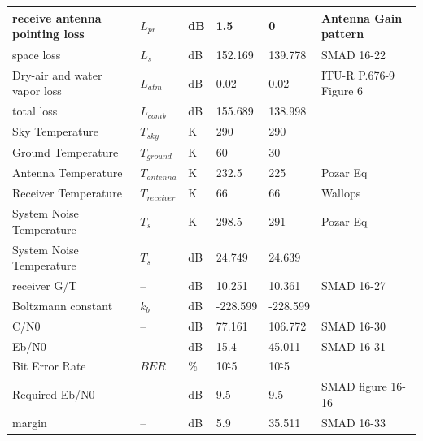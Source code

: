 \documentclass[12pt]{article}
\begin{document}
\begin{center}
\begin{longtable}{| p{3.9cm} | p{1.6cm} | p{1.4cm} | p{1.4cm} | p{1.4cm} | p{5cm} |}
    receive antenna pointing loss & $L_{pr}$ & dB    & 1.5   & 0     & Antenna Gain pattern \\\hline
    space loss & $L_s$  & dB    & 152.169 & 139.778 & SMAD 16-22 \\\hline
    Dry-air and water vapor loss & $L_{atm}$ & dB    & 0.02  & 0.02  & ITU-R P.676-9 Figure 6 \\\hline
    total loss & $L_{comb}$ & dB    & 155.689 & 138.998 &  \\\hline
    Sky Temperature & $T_{sky}$ & K     & 290   & 290   &  \\\hline
    Ground Temperature & $T_{ground}$ & K     & 60    & 30    &  \\\hline
    Antenna Temperature & $T_{antenna}$ & K     & 232.5 & 225   & Pozar Eq \\\hline
    Receiver Temperature & $T_{receiver}$ & K     & 66    & 66    & Wallops \\\hline
    System Noise Temperature & $T_s$  & K     & 298.5 & 291   & Pozar Eq \\\hline
    System Noise Temperature & $T_s$  & dB    & 24.749 & 24.639 &  \\\hline
    receiver G/T & --    & dB    & 10.251 & 10.361 & SMAD 16-27 \\\hline
    Boltzmann constant & $k_b$  & dB    & -228.599 & -228.599 &  \\\hline
    C/N0  & --    & dB    & 77.161 & 106.772 & SMAD 16-30 \\\hline
    Eb/N0 & --    & dB    & 15.4  & 45.011 & SMAD 16-31 \\\hline
    Bit Error Rate & $BER$   & \%    & 10\^-5 & 10\^-5 &  \\\hline
    Required Eb/N0 & --    & dB    & 9.5   & 9.5   & SMAD figure 16-16 \\\hline
    margin & --    & dB    & 5.9   & 35.511 & SMAD 16-33 \\
\hline
\end{longtable}
\end{center}

\noindent
\newline
\newpage
\end{document}
